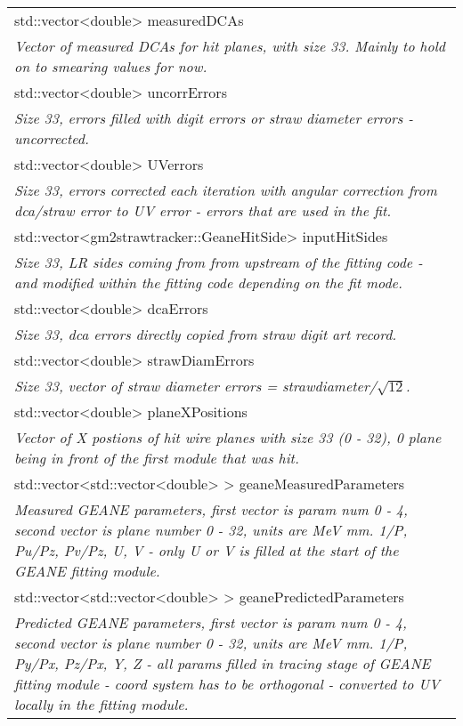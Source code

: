 \begin{longtable}{|p{16cm}|}
std::vector\textless{}double\textgreater{} measuredDCAs \\
\textit{Vector of measured DCAs for hit planes, with size 33. Mainly to hold on to smearing values for now.} \\ \hline

std::vector\textless{}double\textgreater{} uncorrErrors \\
\textit{Size 33, errors filled with digit errors or straw diameter errors - uncorrected.} \\ \hline

std::vector\textless{}double\textgreater{} UVerrors \\
\textit{Size 33, errors corrected each iteration with angular correction from dca/straw error to UV error - errors that are used in the fit.} \\ \hline

std::vector\textless{}gm2strawtracker::GeaneHitSide\textgreater{} inputHitSides \\
\textit{Size 33, LR sides coming from from upstream of the fitting code - and modified within the fitting code depending on the fit mode.}  \\ \hline

std::vector\textless{}double\textgreater{} dcaErrors \\
\textit{Size 33, dca errors directly copied from straw digit art record.} \\ \hline

std::vector\textless{}double\textgreater{} strawDiamErrors \\
\textit{Size 33, vector of straw diameter errors = strawdiameter/$\sqrt{12}$.} \\ \hline

std::vector\textless{}double\textgreater{} planeXPositions \\
\textit{Vector of X postions of hit wire planes with size 33 (0 - 32), 0 plane being in front of the first module that was hit.} \\ \hline

std::vector\textless{}std::vector\textless{}double\textgreater{} \textgreater{} geaneMeasuredParameters \\
\textit{Measured GEANE parameters, first vector is param num 0 - 4, second vector is plane number 0 - 32, units are MeV mm. 1/P, Pu/Pz, Pv/Pz, U, V - only U or V is filled at the start of the GEANE fitting module.} \\ \hline

std::vector\textless{}std::vector\textless{}double\textgreater{} \textgreater{} geanePredictedParameters \\ 
\textit{Predicted GEANE parameters, first vector is param num 0 - 4, second vector is plane number 0 - 32, units are MeV mm. 1/P, Py/Px, Pz/Px, Y, Z - all params filled in tracing stage of GEANE fitting module - coord system has to be orthogonal - converted to UV locally in the fitting module.} \\ \hline


\end{longtable}
